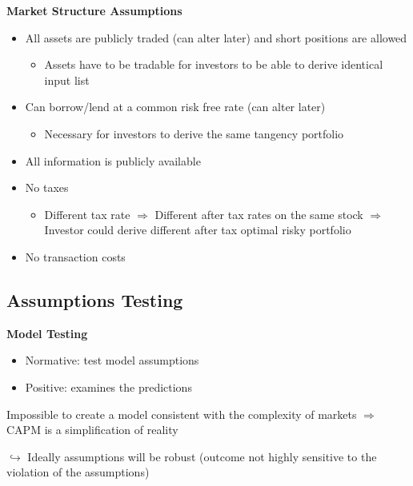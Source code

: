 \documentclass[]{book}
\providecommand{\tightlist}{%
  \setlength{\itemsep}{0pt}\setlength{\parskip}{0pt}}
\theoremstyle{definition}
\theoremstyle{definition}
\theoremstyle{remark}
\begin{document}
 \textbf{Market Structure Assumptions}

\begin{itemize}
\item
  All assets are publicly traded (can alter later) and short positions
  are allowed

  \begin{itemize}
  \tightlist
  \item
    Assets have to be tradable for investors to be able to derive
    identical input list
  \end{itemize}
\item
  Can borrow/lend at a common risk free rate (can alter later)

  \begin{itemize}
  \tightlist
  \item
    Necessary for investors to derive the same tangency portfolio
  \end{itemize}
\item
  All information is publicly available
\item
  No taxes

  \begin{itemize}
  \tightlist
  \item
    Different tax rate \(\Rightarrow\) Different after tax rates on the
    same stock \(\Rightarrow\) Investor could derive different after tax
    optimal risky portfolio
  \end{itemize}
\item
  No transaction costs
\end{itemize}

\subsection{Assumptions Testing}\label{assumptions-testing}

\textbf{Model Testing}

\begin{itemize}
\item
  Normative: test model assumptions
\item
  Positive: examines the predictions
\end{itemize}

Impossible to create a model consistent with the complexity of markets
\(\Rightarrow\) CAPM is a simplification of reality

\(\hookrightarrow\) Ideally assumptions will be robust (outcome not
highly sensitive to the violation of the assumptions)
\end{document}
